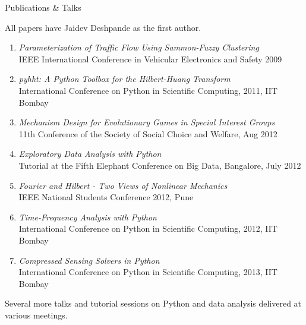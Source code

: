 \documentclass{resume} %
\begin{document}
\begin{rSection}{Publications \& Talks}

All papers have Jaidev Deshpande as the first author.

\begin{enumerate}

\item \textit{Parameterization of Traffic Flow Using Sammon-Fuzzy Clustering} \\
    IEEE International Conference in Vehicular Electronics and Safety 2009
\item \textit{pyhht: A Python Toolbox for the Hilbert-Huang Transform} \\
    International Conference on Python in Scientific Computing, 2011, IIT Bombay
\item \textit{Mechanism Design for Evolutionary Games in Special Interest
    Groups} \\
    11th Conference of the Society of Social Choice and Welfare, Aug 2012
\item \textit{Exploratory Data Analysis with Python} \\ 
    Tutorial at the Fifth Elephant Conference on Big Data, Bangalore, July 2012
\item \textit{Fourier and Hilbert - Two Views of Nonlinear Mechanics} \\ 
    IEEE National Students Conference 2012, Pune
\item \textit{Time-Frequency Analysis with Python} \\
    International Conference on Python in Scientific Computing, 2012, IIT Bombay
\item \textit{Compressed Sensing Solvers in Python} \\
    International Conference on Python in Scientific Computing, 2013, IIT Bombay

\end{enumerate}

Several more talks and tutorial sessions on Python and data analysis delivered at various meetings.

\end{rSection}

\end{document}

